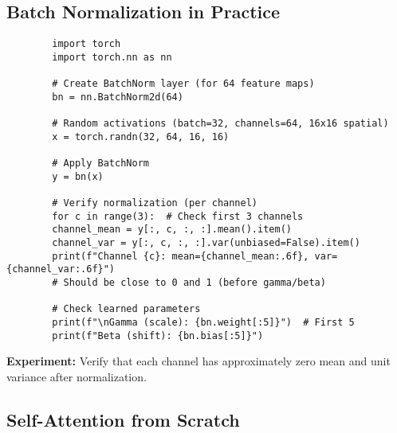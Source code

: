 \subsection{Batch Normalization in Practice}

\begin{codebox}
	\begin{lstlisting}
		import torch
		import torch.nn as nn
		
		# Create BatchNorm layer (for 64 feature maps)
		bn = nn.BatchNorm2d(64)
		
		# Random activations (batch=32, channels=64, 16x16 spatial)
		x = torch.randn(32, 64, 16, 16)
		
		# Apply BatchNorm
		y = bn(x)
		
		# Verify normalization (per channel)
		for c in range(3):  # Check first 3 channels
		channel_mean = y[:, c, :, :].mean().item()
		channel_var = y[:, c, :, :].var(unbiased=False).item()
		print(f"Channel {c}: mean={channel_mean:.6f}, var={channel_var:.6f}")
		# Should be close to 0 and 1 (before gamma/beta)
		
		# Check learned parameters
		print(f"\nGamma (scale): {bn.weight[:5]}")  # First 5
		print(f"Beta (shift): {bn.bias[:5]}")
	\end{lstlisting}
	
	\textbf{Experiment:} Verify that each channel has approximately zero mean and unit variance after normalization.
\end{codebox}

\subsection{Self-Attention from Scratch}

